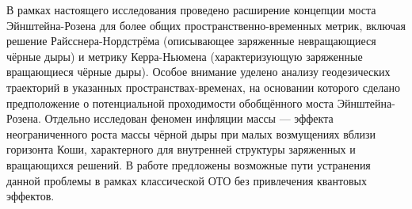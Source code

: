В рамках настоящего исследования проведено расширение концепции моста Эйнштейна-Розена для более общих пространственно-временных метрик, включая решение Райсснера-Нордстрёма (описывающее заряженные невращающиеся чёрные дыры) и метрику Керра-Ньюмена (характеризующую заряженные вращающиеся чёрные дыры). Особое внимание уделено анализу геодезических траекторий в указанных пространствах-временах, на основании которого сделано предположение о потенциальной проходимости обобщённого моста Эйнштейна-Розена. Отдельно исследован феномен инфляции массы — эффекта неограниченного роста массы чёрной дыры при малых возмущениях вблизи горизонта Коши, характерного для внутренней структуры заряженных и вращающихся решений. В работе предложены возможные пути устранения данной проблемы в рамках классической ОТО без привлечения квантовых эффектов.


%

